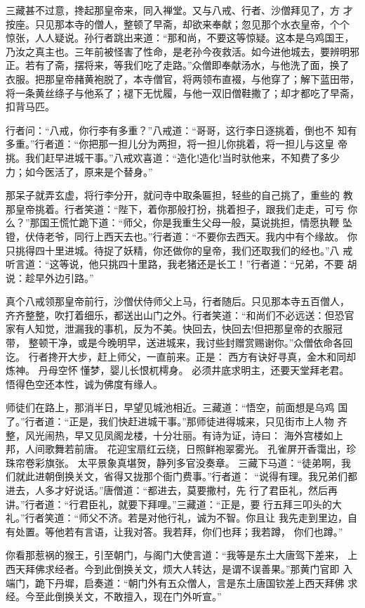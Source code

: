 三藏甚不过意，搀起那皇帝来，同入禅堂。又与八戒、行者、沙僧拜见了，方
才按座。只见那本寺的僧人，整顿了早斋，却欲来奉献；忽见那个水衣皇帝，个个
惊张，人人疑说。孙行者跳出来道：“那和尚，不要这等惊疑。这本是乌鸡国王，
乃汝之真主也。三年前被怪害了性命，是老孙今夜救活。如今进他城去，要辨明邪
正。若有了斋，摆将来，等我们吃了走路。”众僧即奉献汤水，与他洗了面，换了
衣服。把那皇帝赭黄袍脱了，本寺僧官，将两领布直裰，与他穿了；解下蓝田带，
将一条黄丝绦子与他系了；褪下无忧履，与他一双旧僧鞋撒了；却才都吃了早斋，
扣背马匹。

行者问：“八戒，你行李有多重？”八戒道：“哥哥，这行李日逐挑着，倒也不
知有多重。”行者道：“你把那一担儿分为两担，将一担儿你挑着，将一担儿与这皇
帝挑。我们赶早进城干事。”八戒欢喜道：“造化!造化!当时驮他来，不知费了多少
力；如今医活了，原来是个替身。”

那呆子就弄玄虚，将行李分开，就问寺中取条匾担，轻些的自己挑了，重些的
教那皇帝挑着。行者笑道：“陛下，着你那般打扮，挑着担子，跟我们走走，可亏
你么？”那国王慌忙跪下道：“师父，你是我重生父母一般，莫说挑担，情愿执鞭
坠镫，伏侍老爷，同行上西天去也。”行者道：“不要你去西天。我内中有个缘故。
你只挑得四十里进城。待捉了妖精，你还做你的皇帝，我们还取我们的经也。”八
戒听言道：“这等说，他只挑四十里路，我老猪还是长工！”行者道：“兄弟，不要
胡说：趁早外边引路。”

真个八戒领那皇帝前行，沙僧伏侍师父上马，行者随后。只见那本寺五百僧人，
齐齐整整，吹打着细乐，都送出山门之外。行者笑道：“和尚们不必远送：但恐官
家有人知觉，泄漏我的事机，反为不美。快回去，快回去!但把那皇帝的衣服冠带，
整顿干净，或是今晚明早，送进城来，我讨些封赠赏赐谢你。”众僧依命各回讫。
行者搀开大步，赶上师父，一直前来。正是：
西方有诀好寻真，金木和同却炼神。
丹母空怀懂梦，婴儿长恨杌樗身。
必须井底求明主，还要天堂拜老君。
悟得色空还本性，诚为佛度有缘人。

师徒们在路上，那消半日，早望见城池相近。三藏道：“悟空，前面想是乌鸡
国了。”行者道：“正是，我们快赶进城干事。”那师徒进得城来，只见街市上人物
齐整，风光闹热，早又见凤阁龙楼，十分壮丽。有诗为证，诗曰：
海外宫楼如上邦，人间歌舞若前唐。
花迎宝扇红云绕，日照鲜袍翠雾光。
孔雀屏开香霭出，珍珠帘卷彩旗张。
太平景象真堪贺，静列多官没奏章。
三藏下马道：“徒弟啊，我们就此进朝倒换关文，省得又拢那个衙门费事。”行者道：
“说得有理。我兄弟们都进去，人多才好说话。”唐僧道：“都进去，莫要撒村，先
行了君臣礼，然后再讲。”行者道：“行君臣礼，就要下拜哩。”三藏道：“正是，要
行五拜三叩头的大礼。”行者笑道：“师父不济。若是对他行礼，诚为不智。你且让
我先走到里边，自有处置。等他若有言语，让我对答。我若拜，你们也拜；我若蹲，
你们也蹲。”

你看那惹祸的猴王，引至朝门，与阁门大使言道：“我等是东土大唐驾下差来，
上西天拜佛求经者。今到此倒换关文，烦大人转达，是谓不误善果。”那黄门官即
入端门，跪下丹墀，启奏道：“朝门外有五众僧人，言是东土唐国钦差上西天拜佛
求经。今至此倒换关文，不敢擅入，现在门外听宣。”

